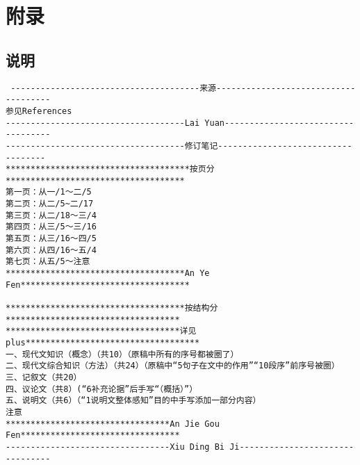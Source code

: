 \appendix
{}
\section{附录}
\subsection{说明}
\begin{verbatim} --------------------------------------来源-------------------------------------
参见References
------------------------------------Lai Yuan-----------------------------------
------------------------------------修订笔记-----------------------------------
*************************************按页分************************************
第一页：从一/1～二/5
第二页：从二/5~二/17
第三页：从二/18～三/4
第四页：从三/5～三/16
第五页：从三/16～四/5
第六页：从四/16～五/4
第七页：从五/5～注意
************************************An Ye Fen**********************************

************************************按结构分***********************************
***********************************详见plus***********************************
一、现代文知识（概念）（共10）（原稿中所有的序号都被圈了）
二、现代文综合知识（方法）（共24）（原稿中“5句子在文中的作用”“10段序”前序号被圈）
三、记叙文（共20）
四、议论文（共8）(“6补充论据”后手写“（概括）”）
五、说明文（共6）（“1说明文整体感知”目的中手写添加一部分内容）
注意
*********************************An Jie Gou Fen********************************
---------------------------------Xiu Ding Bi Ji--------------------------------


\end{verbatim}
